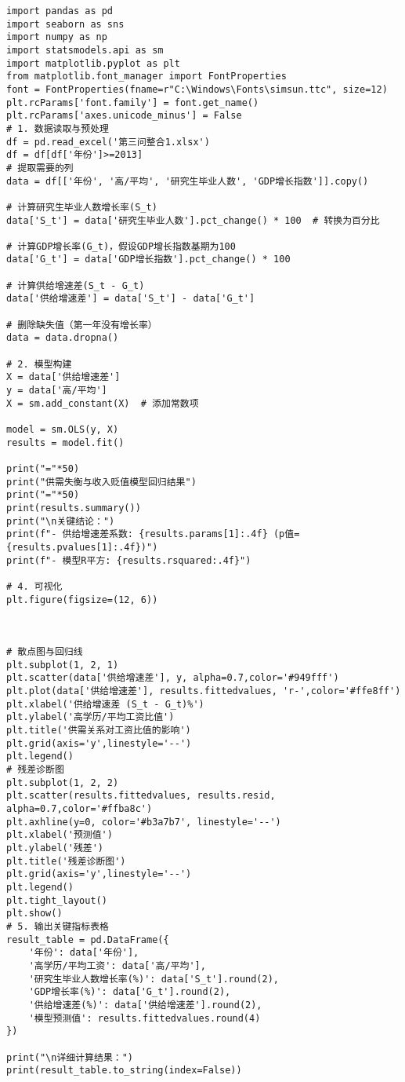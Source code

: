\documentclass[withoutpreface,bwprint]{cumcmthesis} %
\begin{document}
\begin{verbatim}
import pandas as pd
import seaborn as sns
import numpy as np
import statsmodels.api as sm
import matplotlib.pyplot as plt
from matplotlib.font_manager import FontProperties
font = FontProperties(fname=r"C:\Windows\Fonts\simsun.ttc", size=12)
plt.rcParams['font.family'] = font.get_name()
plt.rcParams['axes.unicode_minus'] = False
# 1. 数据读取与预处理
df = pd.read_excel('第三问整合1.xlsx')
df = df[df['年份']>=2013]
# 提取需要的列
data = df[['年份', '高/平均', '研究生毕业人数', 'GDP增长指数']].copy()

# 计算研究生毕业人数增长率(S_t)
data['S_t'] = data['研究生毕业人数'].pct_change() * 100  # 转换为百分比

# 计算GDP增长率(G_t)，假设GDP增长指数基期为100
data['G_t'] = data['GDP增长指数'].pct_change() * 100

# 计算供给增速差(S_t - G_t)
data['供给增速差'] = data['S_t'] - data['G_t']

# 删除缺失值（第一年没有增长率）
data = data.dropna()

# 2. 模型构建
X = data['供给增速差']
y = data['高/平均']
X = sm.add_constant(X)  # 添加常数项

model = sm.OLS(y, X)
results = model.fit()

print("="*50)
print("供需失衡与收入贬值模型回归结果")
print("="*50)
print(results.summary())
print("\n关键结论：")
print(f"- 供给增速差系数: {results.params[1]:.4f} (p值={results.pvalues[1]:.4f})")
print(f"- 模型R平方: {results.rsquared:.4f}")

# 4. 可视化
plt.figure(figsize=(12, 6))



# 散点图与回归线
plt.subplot(1, 2, 1)
plt.scatter(data['供给增速差'], y, alpha=0.7,color='#949fff')
plt.plot(data['供给增速差'], results.fittedvalues, 'r-',color='#ffe8ff')
plt.xlabel('供给增速差 (S_t - G_t)%')
plt.ylabel('高学历/平均工资比值')
plt.title('供需关系对工资比值的影响')
plt.grid(axis='y',linestyle='--')
plt.legend()
# 残差诊断图
plt.subplot(1, 2, 2)
plt.scatter(results.fittedvalues, results.resid, alpha=0.7,color='#ffba8c')
plt.axhline(y=0, color='#b3a7b7', linestyle='--')
plt.xlabel('预测值')
plt.ylabel('残差')
plt.title('残差诊断图')
plt.grid(axis='y',linestyle='--')
plt.legend()
plt.tight_layout()
plt.show()
# 5. 输出关键指标表格
result_table = pd.DataFrame({
    '年份': data['年份'],
    '高学历/平均工资': data['高/平均'],
    '研究生毕业人数增长率(%)': data['S_t'].round(2),
    'GDP增长率(%)': data['G_t'].round(2),
    '供给增速差(%)': data['供给增速差'].round(2),
    '模型预测值': results.fittedvalues.round(4)
})

print("\n详细计算结果：")
print(result_table.to_string(index=False))
\end{verbatim}
\end{document}
